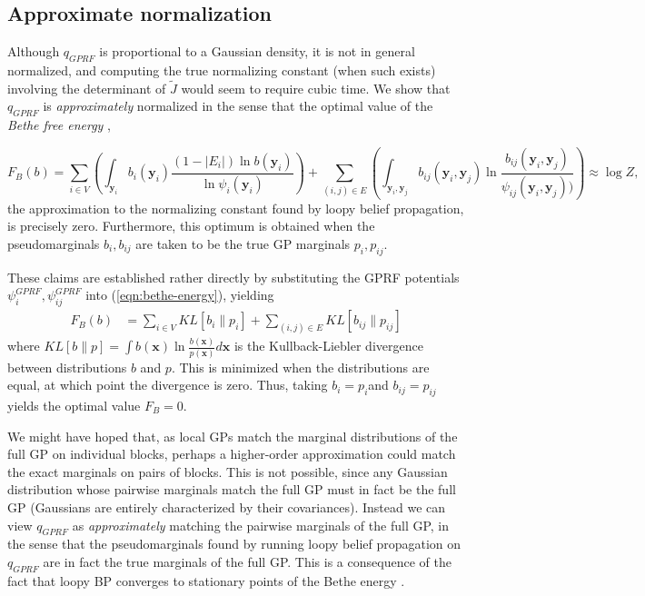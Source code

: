 \documentclass{article}
\renewcommand{\v}[1]{\mathbf{#1}}
\begin{document}
\subsection{Approximate normalization}
\label{sec:approx-norm}

Although $q_{GPRF}$ is proportional to a Gaussian density, it is not
in general normalized, and computing the true normalizing constant
(when such exists) involving the determinant of $\tilde{J}$ would seem to require
cubic time. We show
that $q_{GPRF}$ is {\em approximately} normalized in the sense that
the optimal value of the {\em Bethe free energy} \cite{yedidia2001bethe}, 

\begin{equation}
F_B(b) = \sum_{i\in V} \left(\int_{\v{y}_i} b_i(\v{y}_i) \frac{(1-|E_i|)\ln
    b(\v{y}_i)}{\ln \psi_i(\v{y}_i)}\right)  + \sum_{(i,j)\in E} \left(\int_{\v{y}_i, \v{y}_j} b_{ij}(\v{y}_i,
  \v{y}_j) \ln \frac{b_{ij}(\v{y}_i,
  \v{y}_j)}{\psi_{ij}(\v{y}_i, \v{y}_j))}\right)
\label{eqn:bethe-energy} \approx \log Z,
\end{equation}
the approximation to the normalizing constant found by loopy belief
propagation, is precisely zero. Furthermore, this
optimum is obtained when the pseudomarginals $b_i, b_{ij}$ are
taken to be the true GP marginals $p_i, p_{ij}$. 

These claims are established rather directly by substituting the GPRF potentials
$\psi_i^{GPRF}, \psi_{ij}^{GPRF}$ into (\ref{eqn:bethe-energy}), yielding
\begin{align}
F_B(b)&= \sum_{i\in V} KL[b_i \| p_i] + \sum_{(i,j)\in E} KL[b_{ij}\| p_{ij}]
\end{align}
where $KL[b\|p] = \int b(\v{x}) \ln \frac{b(\v{x})}{p(\v{x})}d\v{x}$
is the Kullback-Liebler divergence between distributions $b$ and
$p$.  This is minimized when the distributions are equal, at which
point the divergence is zero. Thus, taking $b_i=p_i$and
$b_{ij}=p_{ij}$ yields the optimal value $F_B=0$.

We might have hoped that, as local GPs match the marginal
distributions of the full GP on individual blocks, perhaps a
higher-order approximation could match the exact marginals on pairs of
blocks. This is not possible, since any Gaussian distribution whose
pairwise marginals match the full GP must in fact be the full GP
(Gaussians are entirely characterized by their covariances). Instead we
can view $q_{GPRF}$ as {\em approximately} matching the pairwise
marginals of the full GP, in the sense that the pseudomarginals found
by running loopy belief propagation on $q_{GPRF}$ are in fact the true
marginals of the full GP. This is a consequence of the fact that loopy
BP converges to stationary points of the Bethe energy
\cite{yedidia2001bethe}.
\end{document}
